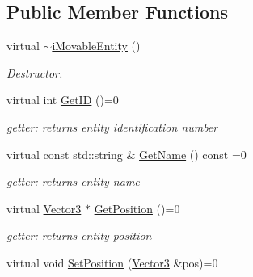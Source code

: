 \subsection*{Public Member Functions}
\begin{DoxyCompactItemize}
\item 
\mbox{\label{classiMovableEntity_a7ef5def1645b30429c910bfd6a6b67ef}} 
virtual \hyperlink{classiMovableEntity_a7ef5def1645b30429c910bfd6a6b67ef}{$\sim$i\+Movable\+Entity} ()
\begin{DoxyCompactList}\small\item\em Destructor. \end{DoxyCompactList}\item 
\mbox{\label{classiMovableEntity_a1723b1c151cd37c60d4dc8925e8fa571}} 
virtual int \hyperlink{classiMovableEntity_a1723b1c151cd37c60d4dc8925e8fa571}{Get\+ID} ()=0
\begin{DoxyCompactList}\small\item\em getter\+: returns entity identification number \end{DoxyCompactList}\item 
\mbox{\label{classiMovableEntity_a580ed40373852e32dd81bc3a92903d3e}} 
virtual const std\+::string \& \hyperlink{classiMovableEntity_a580ed40373852e32dd81bc3a92903d3e}{Get\+Name} () const =0
\begin{DoxyCompactList}\small\item\em getter\+: returns entity name \end{DoxyCompactList}\item 
\mbox{\label{classiMovableEntity_aba07ec07fb682e277e3e997256bda000}} 
virtual \hyperlink{classVector3}{Vector3} $\ast$ \hyperlink{classiMovableEntity_aba07ec07fb682e277e3e997256bda000}{Get\+Position} ()=0
\begin{DoxyCompactList}\small\item\em getter\+: returns entity position \end{DoxyCompactList}\item 
\mbox{\label{classiMovableEntity_afbf41c5d1499bfe87054a53de7d87fe8}} 
virtual void \hyperlink{classiMovableEntity_afbf41c5d1499bfe87054a53de7d87fe8}{Set\+Position} (\hyperlink{classVector3}{Vector3} \&pos)=0

\end{DoxyCompactItemize}

